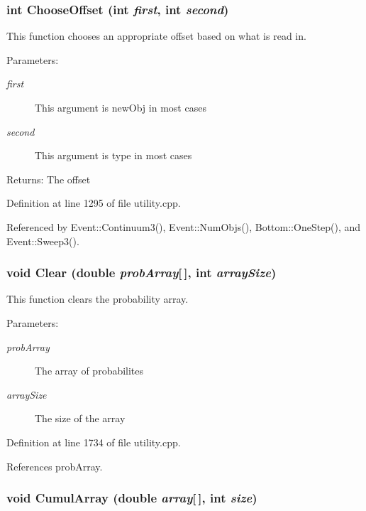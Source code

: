 \subsubsection{\setlength{\rightskip}{0pt plus 5cm}int Choose\-Offset (int {\em first}, int {\em second})}\label{utility_8h_a26}


This function chooses an appropriate offset based on what is read in. \begin{Desc}
\item[Parameters:]
\begin{description}
\item[{\em first}]This argument is new\-Obj in most cases \item[{\em second}]This argument is type in most cases \end{description}
\end{Desc}
\begin{Desc}
\item[Returns:]The offset \end{Desc}


Definition at line 1295 of file utility.cpp.

Referenced by Event::Continuum3(), Event::Num\-Objs(), Bottom::One\-Step(), and Event::Sweep3().
\subsubsection{\setlength{\rightskip}{0pt plus 5cm}void Clear (double {\em prob\-Array}[$\,$], int {\em array\-Size})}\label{utility_8h_a44}


This function clears the probability array. \begin{Desc}
\item[Parameters:]
\begin{description}
\item[{\em prob\-Array}]The array of probabilites \item[{\em array\-Size}]The size of the array \end{description}
\end{Desc}


Definition at line 1734 of file utility.cpp.

References prob\-Array.
\subsubsection{\setlength{\rightskip}{0pt plus 5cm}void Cumul\-Array (double {\em array}[$\,$], int {\em size})}\label{utility_8h_a7}


